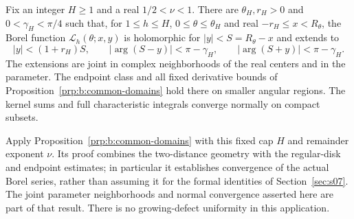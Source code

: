 \begin{crl}\label{crl:s08:domains}
Fix an integer $H\geq1$ and a real $1/2<\nu<1$. There are
$\theta_H,r_H>0$ and $0<\gamma_H<\pi/4$ such that, for
$1\leq h\leq H$, $0\leq\theta\leq\theta_H$ and real
$-r_H\leq x<R_\theta$, the Borel function
$\mathcal L_h(\theta;x,y)$ is holomorphic for $|y|<S=R_\theta-x$
and extends to
\begin{equation}\label{eq:s08:dented-domains}
 |y|<(1+r_H)S,\qquad
 |\arg(S-y)|<\pi-\gamma_H,\qquad
 |\arg(S+y)|<\pi-\gamma_H.
\end{equation}
The extensions are joint in complex neighborhoods of the real
centers and in the parameter. The endpoint class and all fixed
derivative bounds of Proposition~\ref{prp:b:common-domains} hold
there on smaller angular regions. The kernel sums and full
characteristic integrals converge normally on compact subsets.
\end{crl}
\begin{prf}
Apply Proposition~\ref{prp:b:common-domains} with this fixed cap
$H$ and remainder exponent $\nu$. Its proof combines the
two-distance geometry with the regular-disk and endpoint estimates;
in particular it establishes convergence of the actual Borel
series, rather than assuming it for the formal identities of
Section~\ref{sec:s07}. The joint parameter neighborhoods and normal
convergence asserted here are part of that result. There is no
growing-defect uniformity in this application.
\end{prf}
